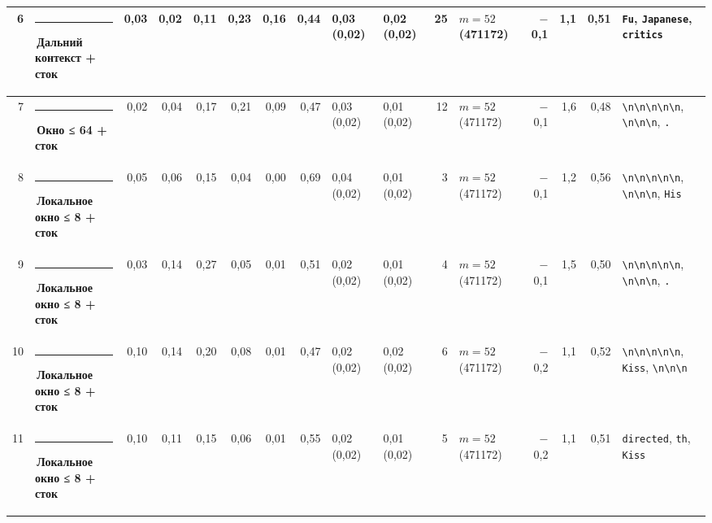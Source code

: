 \documentclass[10pt]{article}
\begin{document}
\begin{minipage}{\linewidth}
\begin{center}
{\begin{tabular}{|r|l|r|r|r|r|r|r|l|l|r|l|r|r|r|l|}
6 & \textcolor[HTML]{C3C2B7}{\rule{0.62em}{0.62em}}\,Дальний контекст + сток & 0,03 & 0,02 & 0,11 & 0,23 & 0,16 & 0,44 & 0,03 (0,02) & 0,02 (0,02) & 25 & $m{=}52$ (471172) & $-$0,1 & 1,1 & 0,51 & \texttt{\textvisiblespace{}Fu}, \texttt{\textvisiblespace{}Japanese}, \texttt{\textvisiblespace{}critics} \\ \hline
7 & \textcolor[HTML]{EDA100}{\rule{0.62em}{0.62em}}\,\textbf{Окно ≤ 64 + сток} & 0,02 & 0,04 & 0,17 & 0,21 & 0,09 & 0,47 & 0,03 (0,02) & 0,01 (0,02) & 12 & $m{=}52$ (471172) & $-$0,1 & 1,6 & 0,48 & \texttt{\textvisiblespace{}\textbackslash{}n\textbackslash{}n\textbackslash{}n\textbackslash{}n\textbackslash{}n}, \texttt{\textvisiblespace{}\textbackslash{}n\textbackslash{}n\textbackslash{}n}, \texttt{\textvisiblespace{}.} \\ \hline
8 & \textcolor[HTML]{1BAF7A}{\rule{0.62em}{0.62em}}\,\textbf{Локальное окно ≤ 8 + сток} & 0,05 & 0,06 & 0,15 & 0,04 & 0,00 & 0,69 & 0,04 (0,02) & 0,01 (0,02) & 3 & $m{=}52$ (471172) & $-$0,1 & 1,2 & 0,56 & \texttt{\textvisiblespace{}\textbackslash{}n\textbackslash{}n\textbackslash{}n\textbackslash{}n\textbackslash{}n}, \texttt{\textvisiblespace{}\textbackslash{}n\textbackslash{}n\textbackslash{}n}, \texttt{\textvisiblespace{}His} \\ \hline
9 & \textcolor[HTML]{1BAF7A}{\rule{0.62em}{0.62em}}\,\textbf{Локальное окно ≤ 8 + сток} & 0,03 & 0,14 & 0,27 & 0,05 & 0,01 & 0,51 & 0,02 (0,02) & 0,01 (0,02) & 4 & $m{=}52$ (471172) & $-$0,1 & 1,5 & 0,50 & \texttt{\textvisiblespace{}\textbackslash{}n\textbackslash{}n\textbackslash{}n\textbackslash{}n\textbackslash{}n}, \texttt{\textvisiblespace{}\textbackslash{}n\textbackslash{}n\textbackslash{}n}, \texttt{\textvisiblespace{}.} \\ \hline
10 & \textcolor[HTML]{1BAF7A}{\rule{0.62em}{0.62em}}\,\textbf{Локальное окно ≤ 8 + сток} & 0,10 & 0,14 & 0,20 & 0,08 & 0,01 & 0,47 & 0,02 (0,02) & 0,02 (0,02) & 6 & $m{=}52$ (471172) & $-$0,2 & 1,1 & 0,52 & \texttt{\textvisiblespace{}\textbackslash{}n\textbackslash{}n\textbackslash{}n\textbackslash{}n\textbackslash{}n}, \texttt{\textvisiblespace{}Kiss}, \texttt{\textvisiblespace{}\textbackslash{}n\textbackslash{}n\textbackslash{}n} \\ \hline
11 & \textcolor[HTML]{1BAF7A}{\rule{0.62em}{0.62em}}\,\textbf{Локальное окно ≤ 8 + сток} & 0,10 & 0,11 & 0,15 & 0,06 & 0,01 & 0,55 & 0,02 (0,02) & 0,01 (0,02) & 5 & $m{=}52$ (471172) & $-$0,2 & 1,1 & 0,51 & \texttt{\textvisiblespace{}directed}, \texttt{th}, \texttt{\textvisiblespace{}Kiss} \\ \hline

\end{tabular}}
\end{center}
\end{minipage}
\end{document}
